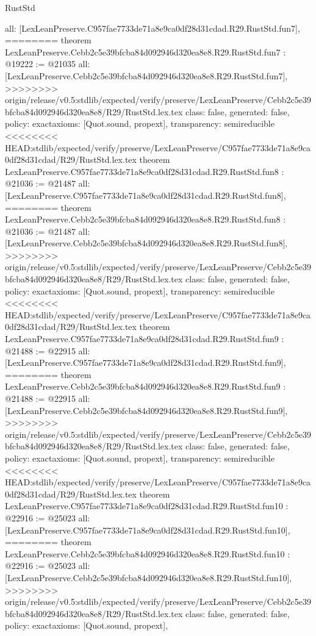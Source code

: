 \begin{lexlean}{RustStd}
\begin{coremodule}
{\begin{coremodule}
{{{{{{{{{{  all: [LexLeanPreserve.C957fae7733de71a8e9ca0df28d31cdad.R29.RustStd.fun7],
========
theorem LexLeanPreserve.Cebb2c5e39bfcba84d092946d320ea8e8.R29.RustStd.fun7 : @19222 := @21035 {
  all: [LexLeanPreserve.Cebb2c5e39bfcba84d092946d320ea8e8.R29.RustStd.fun7],
>>>>>>>> origin/release/v0.5:stdlib/expected/verify/preserve/LexLeanPreserve/Cebb2c5e39bfcba84d092946d320ea8e8/R29/RustStd.lex.tex
  class: false,
  generated: false,
  policy: exact{axioms: [Quot.sound, propext]},
  transparency: semireducible
}
<<<<<<<< HEAD:stdlib/expected/verify/preserve/LexLeanPreserve/C957fae7733de71a8e9ca0df28d31cdad/R29/RustStd.lex.tex
theorem LexLeanPreserve.C957fae7733de71a8e9ca0df28d31cdad.R29.RustStd.fun8 : @21036 := @21487 {
  all: [LexLeanPreserve.C957fae7733de71a8e9ca0df28d31cdad.R29.RustStd.fun8],
========
theorem LexLeanPreserve.Cebb2c5e39bfcba84d092946d320ea8e8.R29.RustStd.fun8 : @21036 := @21487 {
  all: [LexLeanPreserve.Cebb2c5e39bfcba84d092946d320ea8e8.R29.RustStd.fun8],
>>>>>>>> origin/release/v0.5:stdlib/expected/verify/preserve/LexLeanPreserve/Cebb2c5e39bfcba84d092946d320ea8e8/R29/RustStd.lex.tex
  class: false,
  generated: false,
  policy: exact{axioms: [Quot.sound, propext]},
  transparency: semireducible
}
<<<<<<<< HEAD:stdlib/expected/verify/preserve/LexLeanPreserve/C957fae7733de71a8e9ca0df28d31cdad/R29/RustStd.lex.tex
theorem LexLeanPreserve.C957fae7733de71a8e9ca0df28d31cdad.R29.RustStd.fun9 : @21488 := @22915 {
  all: [LexLeanPreserve.C957fae7733de71a8e9ca0df28d31cdad.R29.RustStd.fun9],
========
theorem LexLeanPreserve.Cebb2c5e39bfcba84d092946d320ea8e8.R29.RustStd.fun9 : @21488 := @22915 {
  all: [LexLeanPreserve.Cebb2c5e39bfcba84d092946d320ea8e8.R29.RustStd.fun9],
>>>>>>>> origin/release/v0.5:stdlib/expected/verify/preserve/LexLeanPreserve/Cebb2c5e39bfcba84d092946d320ea8e8/R29/RustStd.lex.tex
  class: false,
  generated: false,
  policy: exact{axioms: [Quot.sound, propext]},
  transparency: semireducible
}
<<<<<<<< HEAD:stdlib/expected/verify/preserve/LexLeanPreserve/C957fae7733de71a8e9ca0df28d31cdad/R29/RustStd.lex.tex
theorem LexLeanPreserve.C957fae7733de71a8e9ca0df28d31cdad.R29.RustStd.fun10 : @22916 := @25023 {
  all: [LexLeanPreserve.C957fae7733de71a8e9ca0df28d31cdad.R29.RustStd.fun10],
========
theorem LexLeanPreserve.Cebb2c5e39bfcba84d092946d320ea8e8.R29.RustStd.fun10 : @22916 := @25023 {
  all: [LexLeanPreserve.Cebb2c5e39bfcba84d092946d320ea8e8.R29.RustStd.fun10],
>>>>>>>> origin/release/v0.5:stdlib/expected/verify/preserve/LexLeanPreserve/Cebb2c5e39bfcba84d092946d320ea8e8/R29/RustStd.lex.tex
  class: false,
  generated: false,
  policy: exact{axioms: [Quot.sound, propext]},
}}}}}}}}}}}}}}
\end{coremodule}}
\end{coremodule}
\end{lexlean}
